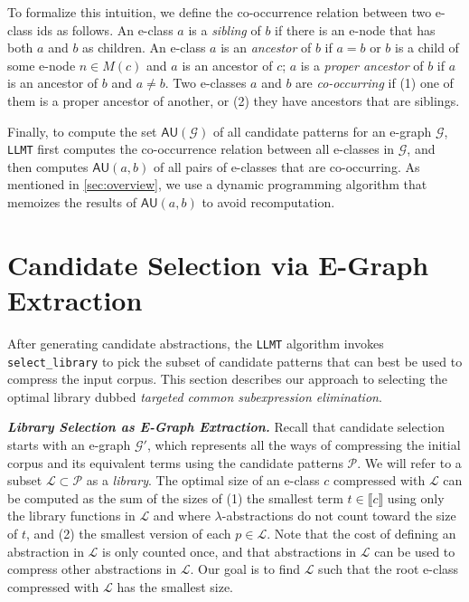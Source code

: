 \documentclass[acmsmall,screen,nonacm,review=false,timestamp=false]{acmart}
\newcommand{\emphbf}[1]{\emph{\textbf{#1}\xspace}}
\newcommand{\mypara}[1]{\smallskip\noindent\emphbf{#1.}\xspace}
\newcommand{\T}[1]{\mbox{\lstinline^#1^}}
\newcommand{\gau}{\mathsf{AU}}
\newcommand{\denot}[1]{\llbracket #1 \rrbracket}
\newcommand{\patset}{\mathcal{P}}
\newcommand{\libset}{\mathcal{L}}
\begin{document}
To formalize this intuition, we define the co-occurrence relation between two e-class ids as follows.
An e-class $a$ is a \emph{sibling} of $b$ if there is an e-node that has both $a$ and $b$ as children.
An e-class $a$ is an \emph{ancestor} of $b$ if $a = b$ or $b$ is a child of some e-node $n \in M(c)$ and $a$ is an ancestor of $c$;
$a$ is a \emph{proper ancestor} of $b$ if $a$ is an ancestor of $b$ and $a \neq b$.
Two e-classes $a$ and $b$ are \emph{co-occurring} if
  (1) one of them is a proper ancestor of another, or
  (2) they have ancestors that are siblings.

Finally, to compute the set $\gau(\mathcal{G})$ of all candidate patterns for an e-graph $\mathcal{G}$,
\T{LLMT} first computes the co-occurrence relation between all e-classes in $\mathcal{G}$,
and then computes $\gau(a,b)$ of all pairs of e-classes that are co-occurring.
As mentioned in \autoref{sec:overview},
we use a dynamic programming algorithm that memoizes the results of $\gau(a,b)$
to avoid recomputation.




 \section{Candidate Selection via E-Graph Extraction}\label{sec:beam}


After generating candidate abstractions,
  the \T{LLMT} algorithm invokes \T{select_library} to pick the subset of candidate patterns
  that can best be used to compress the input corpus.
This section describes our approach to selecting the optimal library dubbed
  \emph{targeted common subexpression elimination}.



\mypara{Library Selection as E-Graph Extraction}
Recall that candidate selection starts with an e-graph $\mathcal{G}'$,
  which represents all the ways of compressing the initial corpus and its equivalent terms
  using the candidate patterns $\patset$.
We will refer to a subset $\libset \subset \patset$ as a \emph{library}.
The optimal size of an e-class $c$ compressed with $\libset$
  can be computed as the sum of the sizes of
  (1) the smallest term $t\in \denot{c}$
      using only the library functions in $\libset$ and
      where $\lambda$-abstractions 
      do not count toward the size of $t$, and
  (2) the smallest version of each $p \in \libset$.
Note that
  the cost of defining an abstraction
  in $\libset$ is only counted once, and
  that abstractions in $\libset$ can be used
  to compress other abstractions in $\libset$.
Our goal is to find $\libset$ such that the root e-class compressed with $\libset$
  has the smallest size.
\end{document}
